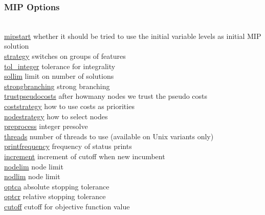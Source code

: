 \subsubsection{MIP Options}
\begin{tabbing}
\hspace {1.3in} \= \\
\hyperlink{mipstart}
{mipstart} \> whether it should be tried to use the initial variable levels as initial MIP solution \\
\hyperlink{strategy}
{strategy} \> switches on groups of features\\
\hyperlink{tol_integer}
{tol\_integer} \> tolerance for integrality \\
\hyperlink{sollim}
{sollim} \> limit on number of solutions \\
\hyperlink{strongbranching}
{strongbranching} \> strong branching \\
\hyperlink{trustpseudocosts}
{trustpseudocosts} \> after howmany nodes we trust the pseudo costs \\
\hyperlink{coststrategy}
{coststrategy} \> how to use costs as priorities \\
\hyperlink{nodestrategy}
{nodestrategy} \> how to select nodes \\
\hyperlink{preprocess}
{preprocess} \> integer presolve \\
\hyperlink{threads}
{threads} \> number of threads to use (available on Unix variants only) \\
\hyperlink{printfrequency}
{printfrequency} \> frequency of status prints \\
\hyperlink{increment}
{increment} \> increment of cutoff when new incumbent \\
\hyperlink{nodelim}
{nodelim} \> node limit \\
\hyperlink{nodlim}
{nodlim} \> node limit \\
\hyperlink{optca}
{optca} \> absolute stopping tolerance \\
\hyperlink{optcr}
{optcr} \> relative stopping tolerance \\
\hyperlink{cutoff}
{cutoff} \> cutoff for objective function value
\end{tabbing}


